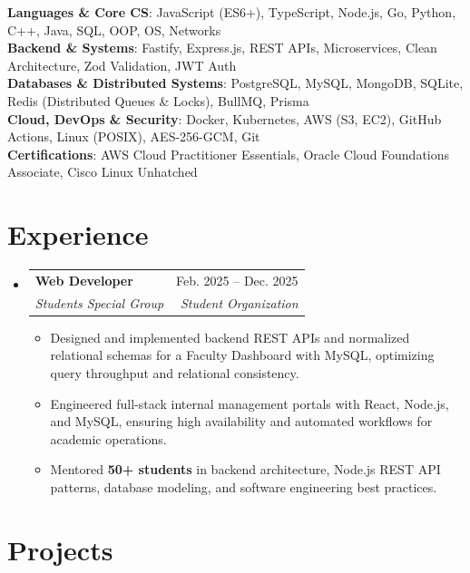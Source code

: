 \documentclass[letterpaper,10.5pt]{article}
\makeatletter
\newcommand{\resumeItem}[1]{
  \item\small{#1\vspace{-1pt}}
}
\newcommand{\resumeSubheading}[4]{
  \vspace{-1pt}\item
  \begin{tabular*}{0.97\textwidth}[t]{l@{\extracolsep{\fill}}r}
    \textbf{#1} & #2 \\
    \textit{\small#3} & \textit{\small#4} \\
  \end{tabular*}
  \vspace{-3pt}
}
\newcommand{\resumeSubHeadingListStart}{
\begin{itemize}[
    leftmargin=0.15in,
    label={},
    itemsep=1.5pt,
    parsep=0pt,
    topsep=1.5pt,
    partopsep=0pt
]
}
\newcommand{\resumeSubHeadingListEnd}{
\end{itemize}
\vspace{-3pt}
}
\newcommand{\resumeItemListStart}{
\begin{itemize}[
    itemsep=0.6pt,
    parsep=0pt,
    topsep=1pt,
    partopsep=0pt,
    leftmargin=0.18in
]
}
\newcommand{\resumeItemListEnd}{
\end{itemize}
\vspace{-2pt}
}
\makeatother
\begin{document}
\begin{itemize}[
    leftmargin=0.15in,
    label={},
    itemsep=1pt,
    parsep=0pt,
    topsep=1pt
]

\small{\item{
\textbf{Languages \& Core CS}{: JavaScript (ES6+), TypeScript, Node.js, Go, Python, C++, Java, SQL, OOP, OS, Networks} \\
\textbf{Backend \& Systems}{: Fastify, Express.js, REST APIs, Microservices, Clean Architecture, Zod Validation, JWT Auth} \\
\textbf{Databases \& Distributed Systems}{: PostgreSQL, MySQL, MongoDB, SQLite, Redis (Distributed Queues \& Locks), BullMQ, Prisma} \\
\textbf{Cloud, DevOps \& Security}{: Docker, Kubernetes, AWS (S3, EC2), GitHub Actions, Linux (POSIX), AES-256-GCM, Git} \\
\textbf{Certifications}{: AWS Cloud Practitioner Essentials, Oracle Cloud Foundations Associate, Cisco Linux Unhatched}
}}

\end{itemize}

\vspace{-5pt}

\section{Experience}

\resumeSubHeadingListStart

\resumeSubheading
{Web Developer}{Feb. 2025 -- Dec. 2025}
{Students Special Group}{Student Organization}

\resumeItemListStart

    \resumeItem{Designed and implemented backend REST APIs and normalized relational schemas for a Faculty Dashboard with MySQL, optimizing query throughput and relational consistency.}

    \resumeItem{Engineered full-stack internal management portals with React, Node.js, and MySQL, ensuring high availability and automated workflows for academic operations.}

    \resumeItem{Mentored \textbf{50+ students} in backend architecture, Node.js REST API patterns, database modeling, and software engineering best practices.}

\resumeItemListEnd

\resumeSubHeadingListEnd

\section{Projects}
\end{document}
